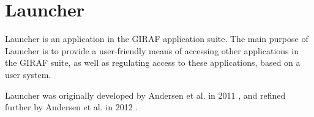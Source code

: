 \section{Launcher}
Launcher is an application in the GIRAF application suite.
The main purpose of Launcher is to provide a user-friendly means of accessing other applications in the GIRAF suite, as well as regulating access to these applications, based on a user system.

Launcher was originally developed by Andersen et al. in 2011 \cite{launcher2011}, and refined further by Andersen et al. in 2012 \cite{launcher2012}.

